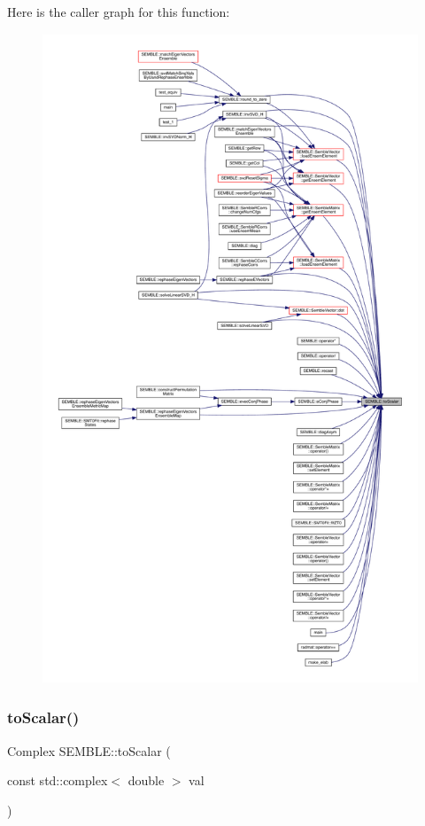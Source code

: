 Here is the caller graph for this function\+:
\nopagebreak
\begin{figure}[H]
\begin{center}
\leavevmode
\includegraphics[height=550pt]{d7/dfd/namespaceSEMBLE_a1f42facef04bfb2c3d89c7a76b9c17d2_icgraph}
\end{center}
\end{figure}
\mbox{\label{namespaceSEMBLE_a29f729adf2ea4f15e9c4e7c11815c179}} 
\subsubsection{\texorpdfstring{toScalar()}{toScalar()}\hspace{0.1cm}{\footnotesize\ttfamily [2/6]}}
{\footnotesize\ttfamily Complex S\+E\+M\+B\+L\+E\+::to\+Scalar (\begin{DoxyParamCaption}\item[{const std\+::complex$<$ double $>$}]{val }\end{DoxyParamCaption})\hspace{0.3cm}{\ttfamily [inline]}}

